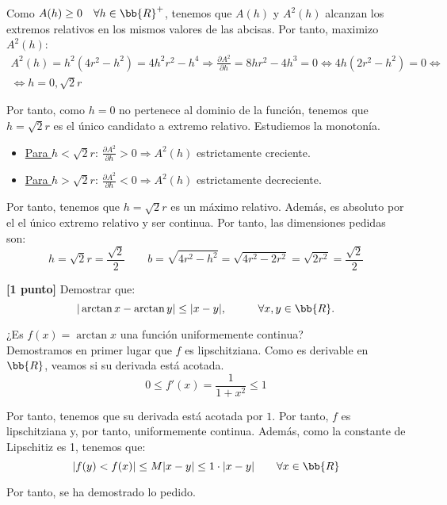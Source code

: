 \documentclass[12pt]{article}
\begin{document}
\begin{ejercicio}
    Como $A(h)\geq 0\quad \forall h\in \bb{R}^+$, tenemos que $A(h)$ y $A^2(h)$ alcanzan los extremos relativos en los mismos valores de las abcisas. Por tanto, maximizo $A^2(h)$:
    \begin{multline*}
        A^2(h)=h^2(4r^2-h^2) = 4h^2r^2-h^4 \Longrightarrow
        \frac{\partial A^2}{\partial h} = 8hr^2-4h^3 = 0 \Longleftrightarrow 4h(2r^2-h^2)=0
        \Longleftrightarrow\\ \Longleftrightarrow h=0,\sqrt{2}r
    \end{multline*}

    Por tanto, como $h=0$ no pertenece al dominio de la función, tenemos que $h=\sqrt{2}r$ es el único candidato a extremo relativo. Estudiemos la monotonía.
    \begin{itemize}
        \item \underline{Para $h<\sqrt{2}r$}: $\frac{\partial A^2}{\partial h}>0\Longrightarrow A^2(h)$ estrictamente creciente.
        \item \underline{Para $h>\sqrt{2}r$}: $\frac{\partial A^2}{\partial h}<0\Longrightarrow A^2(h)$ estrictamente decreciente.
    \end{itemize}

    Por tanto, tenemos que $h=\sqrt{2}r$ es un máximo relativo. Además, es absoluto por el el único extremo relativo y ser continua. Por tanto, las dimensiones pedidas son:
    \begin{equation*}
        h=\sqrt{2}r = \frac{\sqrt{2}}{2}
        \qquad
        b=\sqrt{4r^2-h^2}=\sqrt{4r^2-2r^2}=\sqrt{2r^2} = \frac{\sqrt{2}}{2}
    \end{equation*}
    
\end{ejercicio}

\begin{ejercicio}\textbf{[1 punto]}
Demostrar que:
\begin{equation*}
    |\arctan x - \arctan y|\leq |x-y|, \hspace{1cm} \forall x,y\in \bb{R}.
\end{equation*}

¿Es $f(x)=\arctan x$ una función uniformemente continua?\\

Demostramos en primer lugar que $f$ es lipschitziana. Como es derivable en $\bb{R}$, veamos si su derivada está acotada.
\begin{equation*}
    0\leq f'(x)=\frac{1}{1+x^2} \leq 1
\end{equation*}

Por tanto, tenemos que su derivada está acotada por $1$. Por tanto, $f$ es lipschitziana y, por tanto, uniformemente continua. Además, como la constante de Lipschitiz es 1, tenemos que:
\begin{equation*}
|f(y)<f(x)| \leq M|x-y| \leq 1\cdot |x-y| \qquad \forall x\in \bb{R}
\end{equation*}

Por tanto, se ha demostrado lo pedido.

\end{ejercicio}
\end{document}
